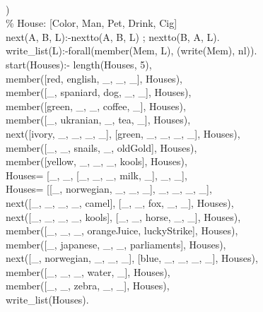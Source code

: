 \documentclass[12pt]{article}
\begin{document}
\pagebreak
\hrulefill \\

) \\
\% House: [Color, Man, Pet, Drink, Cig]\\
next(A, B, L):-nextto(A, B, L) ; nextto(B, A, L).\\
write\_list(L):-forall(member(Mem, L), (write(Mem), nl)).\\

\noindent start(Houses):- length(Houses, 5), \\
    member([red, english, \_, \_, \_], Houses), \\
	member([\_, spaniard, dog, \_, \_], Houses), \\
    member([green, \_, \_, coffee, \_], Houses), \\
    member([\_, ukranian, \_, tea, \_], Houses), \\
    
\noindent next([ivory, \_, \_, \_, \_], [green, \_, \_, \_, \_],  Houses), \\
    
\noindent member([\_, \_, snails, \_, oldGold], Houses), \\
    member([yellow, \_, \_, \_, kools], Houses), \\
    
\noindent Houses= [\_, \_, [\_, \_, \_, milk, \_], \_, \_], \\
    Houses= [[\_, norwegian, \_, \_, \_], \_, \_, \_, \_], \\
    
\noindent next([\_, \_, \_, \_, camel], [\_, \_, fox, \_, \_],  Houses), \\
    next([\_, \_, \_, \_, kools], [\_, \_, horse, \_, \_],  Houses), \\
    
\noindent member([\_, \_, \_, orangeJuice, luckyStrike], Houses), \\
    member([\_, japanese, \_, \_, parliaments], Houses), \\
    
\noindent next([\_, norwegian, \_, \_, \_], [blue, \_, \_, \_, \_],  Houses), \\
    
\noindent member([\_, \_, \_, water, \_], Houses), \\
    member([\_, \_, zebra, \_, \_], Houses), \\
    
\noindent write\_list(Houses).\\\\
\end{document}
